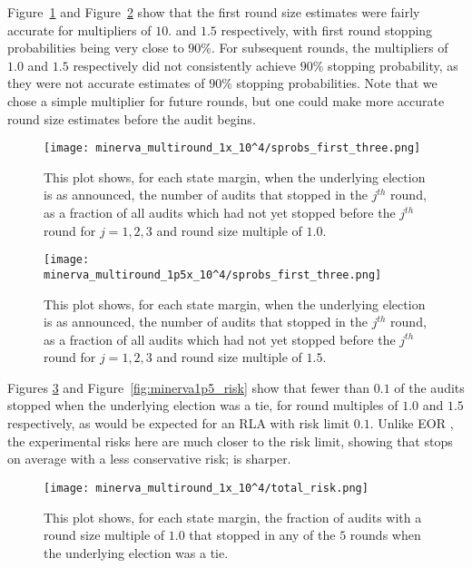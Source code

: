 Figure~\ref{fig:minerva1_sprob} and Figure~\ref{fig:minerva1p5_sprob} show that the first round size estimates were fairly accurate for multipliers of $10.$ and $1.5$ respectively, with first round stopping probabilities being very close to $90\%$. For subsequent rounds, the multipliers of $1.0$ and $1.5$ respectively did not consistently achieve $90\%$ stopping
probability, as they were not accurate estimates of $90\%$ stopping probabilities. Note that we chose a simple multiplier for future rounds, but one could make more accurate round size estimates before the audit begins. 

\begin{figure}
\texttt{[image: minerva\_multiround\_1x\_10^4/sprobs\_first\_three.png]}
\caption{This plot shows, for each state margin, when the underlying election is as announced, the number of \Minerva audits that stopped in the $j^{th}$ round,
as a fraction of all \Minerva audits which had not yet stopped before the $j^{th}$ round for $j=1,2,3$ and round size multiple of $1.0$.}
\label{fig:minerva1_sprob}
\end{figure}

\begin{figure}
\texttt{[image: minerva\_multiround\_1p5x\_10^4/sprobs\_first\_three.png]}
\caption{This plot shows, for each state margin, when the underlying election is as announced, the number of \Minerva audits that stopped in the $j^{th}$ round,
as a fraction of all \Minerva audits which had not yet stopped before the $j^{th}$ round for $j=1,2,3$ and round size multiple of $1.5$.}
\label{fig:minerva1p5_sprob}
\end{figure}

Figures \ref{fig:minerva1_risk} and Figure~\ref{fig:minerva1p5_risk} show that fewer than $0.1$ of the audits stopped when the underlying election was a tie, for round multiples of $1.0$ and $1.5$ respectively, as would be expected for an RLA with risk limit $0.1$. 
Unlike EOR \BRAVO, the experimental risks here are much closer to the risk limit,
showing that \Minerva stops on average with a less conservative risk; \Minerva is sharper.

\begin{figure}
\texttt{[image: minerva\_multiround\_1x\_10^4/total\_risk.png]}
\caption{This plot shows, for each state margin,
the fraction of \Minerva audits with a round size multiple of $1.0$ that stopped in any of the $5$ rounds when the underlying election was a tie.}
\label{fig:minerva1_risk}
\end{figure}


